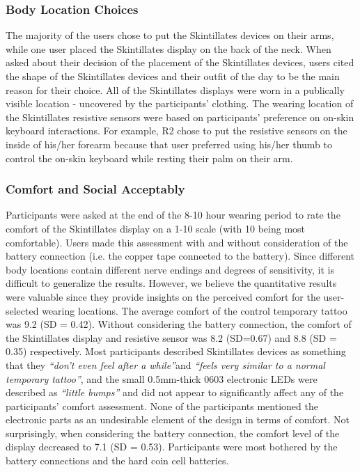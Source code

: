 \documentclass{sigchi}
\begin{document}
\subsubsection{Body Location Choices}
The majority of the users chose to put the Skintillates devices on their arms, while one user placed the Skintillates display on the back of the neck. When asked about their decision of the placement of the Skintillates devices, users cited the shape of the Skintillates devices and their outfit of the day to be the main reason for their choice. All of the Skintillates displays were worn in a publically visible location - uncovered by the participants’ clothing. The wearing location of the Skintillates resistive sensors were based on participants’ preference on on-skin keyboard interactions. For example, R2 chose to put the resistive sensors on the inside of his/her forearm because that user preferred using his/her thumb to control the on-skin keyboard while resting their palm on their arm. 
\subsubsection{Comfort and Social Acceptably}
Participants were asked at the end of the 8-10 hour wearing period to rate the comfort of the Skintillates display on a 1-10 scale (with 10 being most comfortable).  Users made this assessment with and without consideration of the battery connection (i.e. the copper tape connected to the battery). Since different body locations contain different nerve endings and degrees of sensitivity, it is difficult to generalize the results.  However, we believe the quantitative results were valuable since they provide insights on the perceived comfort for the user-selected wearing locations. 
The average comfort of the control temporary tattoo was 9.2 (SD = 0.42). Without considering the battery connection, the comfort of the Skintillates display and resistive sensor was 8.2 (SD=0.67) and 8.8 (SD = 0.35) respectively. Most participants described Skintillates devices as something that they \textit{“don’t even feel after a while”}and \textit{“feels very similar to a normal temporary tattoo”}, and the small 0.5mm-thick 0603 electronic LEDs were described as \textit{“little bumps”} and did not appear to significantly affect any of the participants' comfort assessment.  None of the participants mentioned the electronic parts as an undesirable element of the design in terms of comfort.
Not surprisingly, when considering the battery connection, the comfort level of the display decreased to 7.1 (SD = 0.53). Participants were most bothered by the battery connections and the hard coin cell batteries. 
\end{document}
